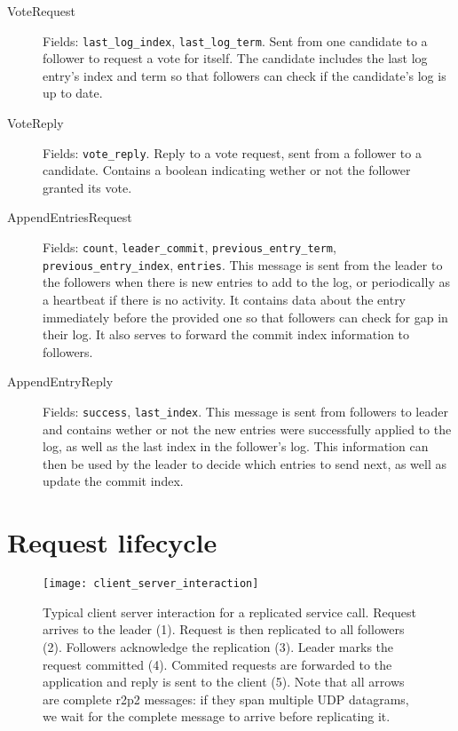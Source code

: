 \begin{description}
    \item[VoteRequest] Fields: \texttt{last\_log\_index}, \texttt{last\_log\_term}.
        Sent from one candidate to a follower to request a vote for itself.
        The candidate includes the last log entry's index and term so that followers can check if the candidate's log is up to date.
    \item[VoteReply] Fields: \texttt{vote\_reply}.
        Reply to a vote request, sent from a follower to a candidate.
        Contains a boolean indicating wether or not the follower granted its vote.
    \item[AppendEntriesRequest] Fields: \texttt{count}, \texttt{leader\_commit}, \texttt{previous\_entry\_term}, \texttt{previous\_entry\_index}, \texttt{entries}.
        This message is sent from the leader to the followers when there is new entries to add to the log, or periodically as a heartbeat if there is no activity.
        It contains data about the entry immediately before the provided one so that followers can check for gap in their log.
        It also serves to forward the commit index information to followers.
    \item[AppendEntryReply] Fields: \texttt{success}, \texttt{last\_index}.
        This message is sent from followers to leader and contains wether or not the new entries were successfully applied to the log, as well as the last index in the follower's log.
        This information can then be used by the leader to decide which entries to send next, as well as update the commit index.
\end{description}



\section{Request lifecycle}

\begin{figure}[hp]
    \centering
    \texttt{[image: client\_server\_interaction]}
    \caption{Typical client server interaction for a replicated service call.
        Request arrives to the leader (1).
        Request is then replicated to all followers (2).
        Followers acknowledge the replication (3).
        Leader marks the request committed (4).
        Commited requests are forwarded to the application and reply is sent to the client (5).
        Note that all arrows are complete \gls{r2p2} messages: if they span multiple UDP datagrams, we wait for the complete message to arrive before replicating it.
    \label{fig:client-server-interaction}
    }
\end{figure}

